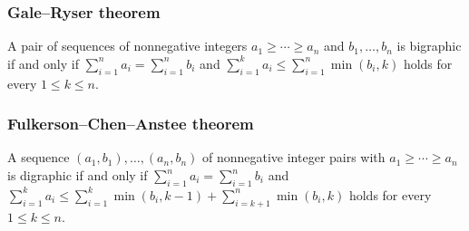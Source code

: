 \subsubsection{Gale–Ryser theorem}
A pair of sequences of nonnegative integers $a_1\ge\cdots\ge a_n$ and $b_1,\ldots,b_n$ is bigraphic if and only if $\displaystyle\sum_{i=1}^n a_i=\displaystyle\sum_{i=1}^n b_i$ and $\displaystyle\sum_{i=1}^k a_i\le \displaystyle\sum_{i=1}^n\min(b_i,k)$ holds for every $1\le k\le n$.

\subsubsection{Fulkerson–Chen–Anstee theorem}
A sequence $(a_1,b_1),\ldots,(a_n,b_n)$ of nonnegative integer pairs with $a_1\ge\cdots\ge a_n$ is digraphic if and only if $\displaystyle\sum_{i=1}^n a_i=\displaystyle\sum_{i=1}^n b_i$ and $\displaystyle\sum_{i=1}^k a_i\le \displaystyle\sum_{i=1}^k\min(b_i,k-1)+\displaystyle\sum_{i=k+1}^n\min(b_i,k)$ holds for every $1\le k\le n$.
